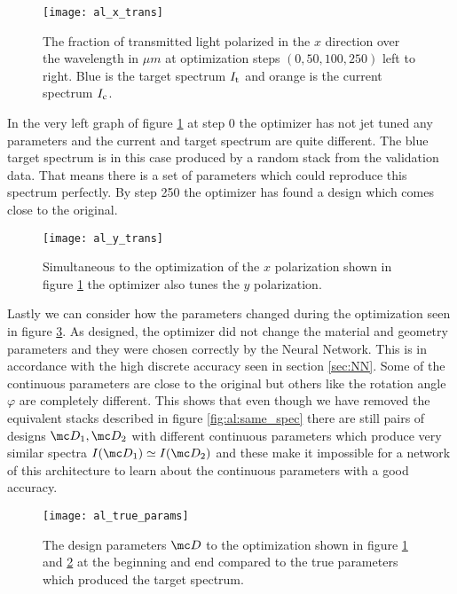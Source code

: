 \begin{figure}[H]
    \centering
    \texttt{[image: al\_x\_trans]}
    \caption{The fraction of transmitted light polarized in the $x$ direction over the wavelength in $\mu m$ at optimization steps 
    $(0, 50, 100, 250)$ left to right. Blue is the target spectrum $I_{\mathrm{t}}$ and orange is the current spectrum $I_{\mathrm{c}}$. }
    \label{fig:al:x_trans}
\end{figure}

In the very left graph of figure \ref{fig:al:x_trans} at step 0 the 
optimizer has not jet tuned any parameters and the current and target spectrum are quite different. The blue target spectrum is in this case produced by a random stack from the validation data. That means there is a set of parameters which could reproduce this spectrum perfectly. By step 250 the optimizer has found a design which comes close to the original.

\begin{figure}[H]
    \centering
    \texttt{[image: al\_y\_trans]}
    \caption{Simultaneous to the optimization of the $x$ polarization shown in figure \ref{fig:al:x_trans} the optimizer also tunes the $y$ polarization.}
    \label{fig:al:y_trans}
\end{figure}

Lastly we can consider how the parameters changed during the optimization seen in figure \ref{fig:al:true_params}. As designed, the optimizer did not change the material and geometry parameters and they were chosen correctly by the Neural Network. This is in accordance with the high discrete accuracy seen in section \ref{sec:NN}. Some of the continuous parameters are close to the original but others like the rotation angle $\varphi$ are completely different. This shows that even though we have removed the equivalent stacks described in figure \ref{fig:al:same_spec} there are still pairs of designs $\mc D_1, \mc D_2$ with different continuous parameters which produce very similar spectra $I \qty(\mc D_1) \simeq I \qty(\mc D_2)$ and these make it impossible for a network of this architecture to learn about the continuous parameters with a good accuracy.

\begin{figure}[H]
    \centering
    \texttt{[image: al\_true\_params]}
    \caption{The design parameters $\mc D$ to the optimization shown in figure \ref{fig:al:x_trans} and \ref{fig:al:y_trans} at the beginning and end compared to the true parameters which produced the target spectrum.}
    \label{fig:al:true_params}
\end{figure} 